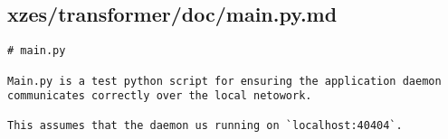 \subsection{xzes/transformer/doc/main.py.md}
\begin{lstlisting}
# main.py

Main.py is a test python script for ensuring the application daemon communicates correctly over the local netowork.

This assumes that the daemon us running on `localhost:40404`.
\end{lstlisting}
